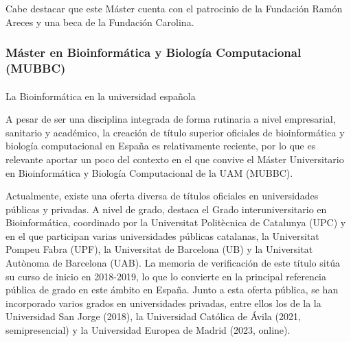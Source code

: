 \documentclass[
  11pt,
  a4paper,
  twoside]{scrreprt}
\makeatletter
\let\oldparagraph\paragraph
\renewcommand{\paragraph}{
    \@ifstar
      \xxxParagraphStar
      \xxxParagraphNoStar
  }
\newcommand{\xxxParagraphStar}[1]{\oldparagraph*{#1}\mbox{}}
\newcommand{\xxxParagraphNoStar}[1]{\oldparagraph{#1}\mbox{}}
\makeatother
\begin{document}
Cabe destacar que este Máster cuenta con el patrocinio de la Fundación
Ramón Areces y una beca de la Fundación Carolina.

\subsubsection{Máster en Bioinformática y Biología Computacional
(MUBBC)}\label{sec-MUBBC}

\paragraph{La Bioinformática en la universidad
española}\label{la-bioinformuxe1tica-en-la-universidad-espauxf1ola}

A pesar de ser una disciplina integrada de forma rutinaria a nivel
empresarial, sanitario y académico, la creación de título superior
oficiales de bioinformática y biología computacional en España es
relativamente reciente, por lo que es relevante aportar un poco del
contexto en el que convive el Máster Universitario en Bioinformática y
Biología Computacional de la UAM (MUBBC).

Actualmente, existe una oferta diversa de títulos oficiales en
universidades públicas y privadas. A nivel de grado, destaca el Grado
interuniversitario en Bioinformática, coordinado por la Universitat
Politècnica de Catalunya (UPC) y en el que participan varias
universidades públicas catalanas, la Universitat Pompeu Fabra (UPF), la
Universitat de Barcelona (UB) y la Universitat Autònoma de Barcelona
(UAB). La memoria de verificación de este título sitúa su curso de
inicio en 2018-2019, lo que lo convierte en la principal referencia
pública de grado en este ámbito en España. Junto a esta oferta pública,
se han incorporado varios grados en universidades privadas, entre ellos
los de la la Universidad San Jorge (2018), la Universidad Católica de
Ávila (2021, semipresencial) y la Universidad Europea de Madrid (2023,
online).
\end{document}
